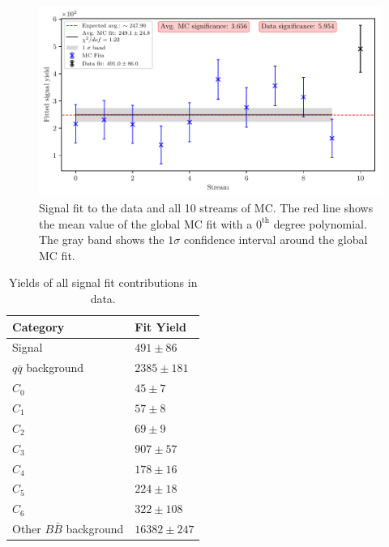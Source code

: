 \begin{figure}[H]
	\centering
	\captionsetup{width=0.8\linewidth}
	\includegraphics[width=\linewidth]{fig/sig_global}
	\caption{Signal fit to the data and all 10 streams of MC. The red line shows the mean value of the global MC fit with a $0^{\mathrm{th}}$ degree polynomial. The gray band shows the $1\sigma$ confidence interval around the global MC fit.}
	\label{fig:sig_all_global}
\end{figure}

\begin{table}[H]
	\centering
	\begin{tabular}{l|l}
		Category & Fit Yield \\
		\toprule
		Signal & $491 \pm 86$ \\
		$q \bar q$ background & $ 2385 \pm 181 $ \\
		$C_0$ & $ 45 \pm 7 $ \\
		$C_1$ & $ 57 \pm 8 $\\
		$C_2$ & $ 69 \pm 9 $ \\
		$C_3$ & $ 907 \pm 57 $ \\
		$C_4$ & $ 178 \pm 16 $ \\
		$C_5$ & $ 224 \pm 18 $ \\
		$C_6$ & $ 322 \pm 108 $ \\
		Other $B \bar B$ background & $ 16382 \pm 247 $ \\
		\bottomrule
	\end{tabular}
	\captionsetup{width=.8\linewidth}
	\caption{Yields of all signal fit contributions in data.}
	\label{tab:sig_yields}
\end{table}


